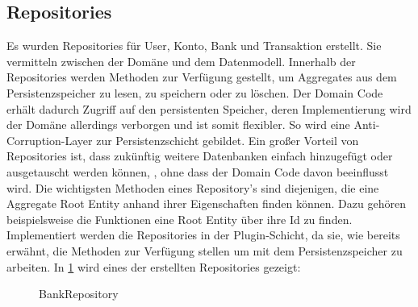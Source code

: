 \subsection{Repositories}
Es wurden Repositories für User, Konto, Bank und Transaktion erstellt. Sie vermitteln zwischen der Domäne und dem Datenmodell. Innerhalb der Repositories werden Methoden zur Verfügung gestellt, 
um Aggregates aus dem Persistenzspeicher zu lesen, zu speichern oder zu löschen. Der Domain Code erhält dadurch Zugriff auf den persistenten Speicher, deren Implementierung wird der Domäne allerdings verborgen und ist somit flexibler. So wird eine Anti-Corruption-Layer zur Persistenzschicht gebildet.
Ein großer Vorteil von Repositories ist, dass zukünftig weitere Datenbanken einfach hinzugefügt oder ausgetauscht werden können, , ohne dass der Domain Code davon beeinflusst wird.
\newline Die wichtigsten Methoden eines Repository's sind diejenigen, die eine Aggregate Root Entity anhand ihrer Eigenschaften finden können. Dazu gehören beispielsweise die Funktionen eine Root Entity über ihre Id zu finden.
\newline Implementiert werden die Repositories in der Plugin-Schicht, da sie, wie bereits erwähnt, die Methoden zur Verfügung stellen um mit dem Persistenzspeicher zu arbeiten.
\newline In \ref{bankRepo} wird eines der erstellten Repositories gezeigt:
\begin{figure}[htbp]
    \centering
    \caption{\label{bankRepo} BankRepository}
\end{figure}
